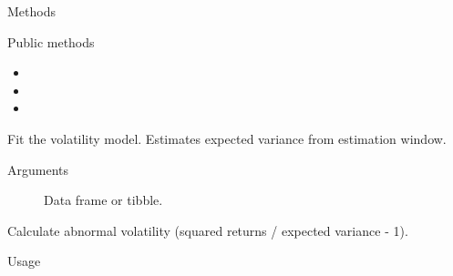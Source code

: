 \documentclass[a4paper]{book}
\begin{document}
\begin{Section}{Methods}
%
\begin{SubSection}{Public methods}
\begin{itemize}

\item{} 
\item{} 
\item{} 

\end{itemize}

\end{SubSection}



\hypertarget{method-VolatilityModel-fit}{}
%
\begin{SubSection}{}
Fit the volatility model. Estimates expected variance from
estimation window.
%

%
\begin{SubSubSection}{Arguments}

\begin{description}

\item[] Data frame or tibble.

\end{description}



\end{SubSubSection}

\end{SubSection}




\hypertarget{method-VolatilityModel-abnormal_returns}{}
%
\begin{SubSection}{}
Calculate abnormal volatility (squared returns / expected variance - 1).
%
\begin{SubSubSection}{Usage}


\end{SubSubSection}
\end{SubSection}
\end{Section}
\end{document}

